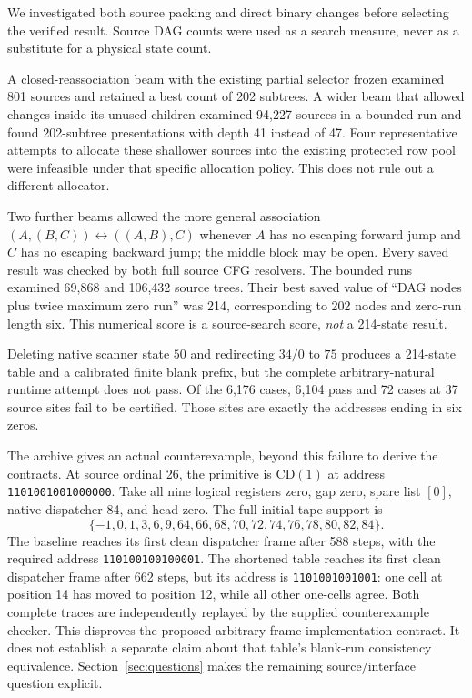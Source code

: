 \documentclass[11pt]{article}
\theoremstyle{definition}\newtheorem{definition}[theorem]{Definition}
\theoremstyle{remark}\newtheorem{remark}[theorem]{Remark}
\begin{document}
We investigated both source packing and direct binary changes before
selecting the verified result. Source DAG counts were used as a search
measure, never as a substitute for a physical state count.

A closed-reassociation beam with the existing partial selector frozen
examined 801 sources and retained a best count of 202 subtrees. A wider
beam that allowed changes inside its unused children examined 94,227
sources in a bounded run and found 202-subtree presentations with depth
41 instead of 47. Four representative attempts to allocate these shallower
sources into the existing protected row pool were infeasible under that
specific allocation policy. This does not rule out a different allocator.

Two further beams allowed the more general association
$(A,(B,C))\leftrightarrow((A,B),C)$ whenever $A$ has no escaping forward
jump and $C$ has no escaping backward jump; the middle block may be open.
Every saved result was checked by both full source CFG resolvers.
The bounded runs examined 69,868 and 106,432 source trees. Their best
saved value of ``DAG nodes plus twice maximum zero run'' was 214,
corresponding to 202 nodes and zero-run length six. This numerical score
is a source-search score, \emph{not} a 214-state result.

Deleting native scanner state $50$ and redirecting $34/0$ to $75$
produces a 214-state table and a calibrated finite blank prefix, but the
complete arbitrary-natural runtime attempt does not pass. Of the 6,176
cases, 6,104 pass and 72 cases at 37 source sites fail to be certified.
Those sites are exactly the addresses ending in six zeros.

The archive gives an actual counterexample, beyond this failure to derive
the contracts. At source ordinal 26, the primitive is $\mathrm{CD}(1)$
at address \texttt{1101001001000000}. Take all nine logical registers
zero, gap zero, spare list $[0]$, native dispatcher 84, and head zero.
The full initial tape support is
\[
\{-1,0,1,3,6,9,64,66,68,70,72,74,76,78,80,82,84\}.
\]
The baseline reaches its first clean dispatcher frame after 588 steps,
with the required address \texttt{110100100100001}. The shortened table
reaches its first clean dispatcher frame after 662 steps, but its address
is \texttt{1101001001001}: one cell at position 14 has moved to position
12, while all other one-cells agree. Both complete traces are independently
replayed by the supplied counterexample checker.
This disproves the proposed arbitrary-frame implementation contract.
It does not establish a separate claim about that table's blank-run
consistency equivalence. Section~\ref{sec:questions} makes the remaining
source/interface question explicit.
\end{document}
